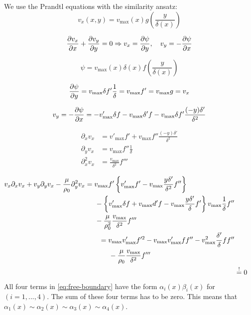 We use the Prandtl equations with the similarity ansatz:
\begin{equation}
v_x(x,y)=v_\mathrm{max}(x)g\left(\frac{y}{\delta(x)}\right)
\end{equation}

\begin{equation}
\frac{\partial v_x}{\partial x}+\frac{\partial v_y}{\partial y}=0 \Rightarrow v_x=\frac{\partial \psi}{\partial y},\quad v_y=-\frac{\partial \psi}{\partial x}
\end{equation}

\begin{equation}
\psi = v_\mathrm{max}(x)\delta(x)f\left(\frac{y}{\delta(x)}\right)
\end{equation}

\begin{equation}
\frac{\partial \psi}{\partial y}=v_\mathrm{max}\delta f'\frac{1}{\delta}=v_\mathrm{max}f'=v_\mathrm{max}g=v_x
\end{equation}

\begin{equation}
v_y=-\frac{\partial \psi}{\partial x}=-v'_\mathrm{max}\delta f-v_\mathrm{max}\delta'f-v_\mathrm{max}\delta f'\frac{(-y)\delta'}{\delta^2}
\end{equation}

\begin{align}
\partial_xv_x &= v'_\mathrm{max}f'+v_\mathrm{max}f''\frac{(-y)\delta'}{\delta^2} \\
\partial_yv_x &= v_\mathrm{max} f''\frac{1}{\delta}\\
\partial^2_xv_x &= \frac{v_\mathrm{max}}{\delta^2}f'''
\end{align}

\begin{align}
\begin{split}
v_x\partial_x v_x+v_y\partial_yv_x-\frac{\mu}{\rho_0}\partial^2_yv_x &= v_\mathrm{max}f'\left\lbrace v'_\mathrm{max}f' - v_\mathrm{max}\frac{y\delta'}{\delta^2}f''\right\rbrace \\
&\hspace{5mm}-\left\lbrace v'_\mathrm{max}\delta f + v_\mathrm{max}d'f-v_\mathrm{max}\frac{y\delta'}{\delta}f'\right\rbrace v_\mathrm{max}\frac{1}{\delta}f'' \\
&\hspace{5mm}-\frac{\mu}{\rho_0^2} \frac{v_\mathrm{max}}{\delta^2}f'''
\end{split}\\
\begin{split}
&= v_\mathrm{max}v'_\mathrm{max}f'^2-v_\mathrm{max}v'_\mathrm{max}ff''-v_\mathrm{max}^2\frac{\delta'}{\delta}ff'' \\
&\hspace{5mm}-\frac{\mu}{\rho_0}\frac{v_\mathrm{max}}{\delta^2}f'''\label{eq:free-boundary}
\end{split} \\
&\overset{!}{=}0
\end{align}
All four terms in \eqref{eq:free-boundary} have the form $\alpha_i(x)\beta_i(x)$ for $(i=1,...,4)$. The sum of these four terms has to be zero. This means that $\alpha_1(x)\sim\alpha_2(x)\sim\alpha_3(x)\sim\alpha_4(x)$.

